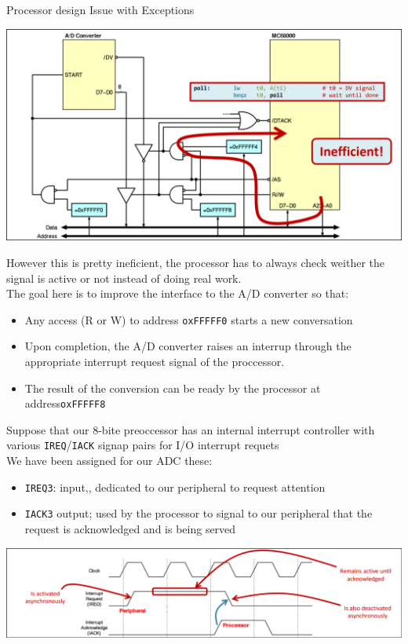 \begin{parag}{Processor design Issue with Exceptions}
\begin{center}
\includegraphics[scale=0.3]{screenshots/2025-10-17.png}
\end{center}
However this is pretty ineficient, the processor has to always check weither the signal is active or not instead of doing real work.\\
The goal here is to improve the interface to the A/D converter so that:
\begin{itemize}
    \item Any access (R or W) to address \texttt{oxFFFFF0} starts a new conversation 
    \item Upon completion, the A/D converter raises an interrup through the appropriate interrupt request signal of the proccessor.
    \item The result of the conversion can be ready by the processor at address\texttt{oxFFFFF8}
\end{itemize}
Suppose that our 8-bite preoccessor has an internal interrupt controller with various \texttt{IREQ}/\texttt{IACK} signap pairs for I/O interrupt requets\\
We have been assigned for our ADC these:
\begin{itemize}
    \item \texttt{IREQ3}: input,, dedicated to our peripheral to request attention
    \item \texttt{IACK3} output; used by the processor to signal to our peripheral that the request is acknowledged and is being served
\end{itemize}
\begin{center}
\includegraphics[scale=0.3]{screenshots/2025-10-17_1.png}

\end{center}
\end{parag}
